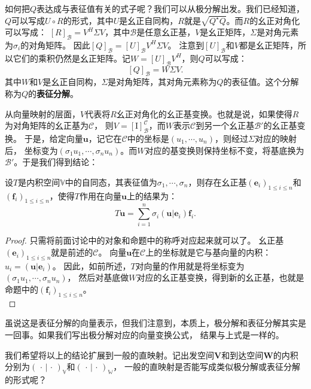 \documentclass[12pt,UTF8]{ctexbook}
\begin{document}
如何把$Q$表达成与表征值有关的式子呢？我们可以从极分解出发。我们已经知道，
$Q$可以写成$U\circ R$的形式，其中$U$是幺正自同构，$R$就是$\sqrt{Q^\star Q}$。而$R$的幺正对角化可以写成：
$[R]_\mathcal{B} = V^H \Sigma V$，其中$\mathcal{B}$是任意幺正基，$V$是幺正矩阵，$\Sigma$是对角元素为$\sigma_i$的对角矩阵。
因此$[Q]_\mathcal{B} = [U]_\mathcal{B} V^H \Sigma V$。
注意到$[U]_\mathcal{B}$和$V$都是幺正矩阵，所以它们的乘积仍然是幺正矩阵。记$W = [U]_\mathcal{B}V^H$，则$Q$可以写成：
$$ [Q]_\mathcal{B} = W \Sigma V. $$
其中$W$和$V$是幺正自同构，$\Sigma$是对角矩阵，其对角元素称为$Q$的表征值。这个分解称为$Q$的\textbf{表征分解}。

从向量映射的层面，$V$代表将$R$幺正对角化的幺正基变换。也就是说，如果使得$R$为对角矩阵的幺正基为$\mathcal{C}$，
则$V = [\mathrm{I}]_\mathcal{B}^\mathcal{C}$，而$W$表示$\mathcal{C}$到另一个幺正基$\mathcal{B}'$的幺正基变换。
于是，给定向量$\mathbf{u}$，记它在$\mathcal{C}$中的坐标是$(u_1, \cdots, u_n)$，则经过$\Sigma$对应的映射后，
坐标变为$(\sigma_1 u_1, \cdots, \sigma_n u_n)$。而$W$对应的基变换则保持坐标不变，将基底换为$\mathcal{B}'$。于是我们得到结论：
\begin{pp}\label{pp:8_15}
    设$T$是内积空间$\mathbb{V}$中的自同态，其表征值为$\sigma_1 , \cdots , \sigma_n$，则存在幺正基$(\mathbf{e}_i)_{1\leqslant i \leqslant n}$和
    $(\mathbf{f}_i)_{1\leqslant i \leqslant n}$，使得$T$作用在向量$\mathbf{u}$上的结果为：
    $$ T\mathbf{u} = \sum_{i=1}^n \sigma_i (\mathbf{u} | \mathbf{e}_i) \mathbf{f}_i.$$
\end{pp}
\begin{proof} %
    只需将前面讨论中的对象和命题中的称呼对应起来就可以了。
    幺正基$(\mathbf{e}_i)_{1\leqslant i \leqslant n}$就是前述的$\mathcal{C}$。
    向量$\mathbf{u}$在$\mathcal{C}$上的坐标就是它与基向量的内积：$u_i = (\mathbf{u} | \mathbf{e}_i)$。
    因此，如前所述，$T$对向量的作用就是将坐标变为$(\sigma_1 u_1, \cdots, \sigma_n u_n)$，
    然后对基底做$W$对应的幺正基变换，得到新的幺正基，也就是命题中的$(\mathbf{f}_i)_{1\leqslant i \leqslant n}$。\\
\end{proof}

虽说这是表征分解的向量表示，但我们注意到，本质上，极分解和表征分解其实是一回事。如果我们写出极分解对应的向量变换公式，
结果与上式是一样的。

我们希望将以上的结论扩展到一般的直映射。记出发空间$\mathbf{V}$和到达空间$\mathbf{W}$的内积分别为$(\,\cdot\,|\,\cdot\,)_\mathbb{V}$和$(\,\cdot\,|\,\cdot\,)_\mathbb{W}$，
一般的直映射是否能写成类似极分解或表征分解的形式呢？
\end{document}
